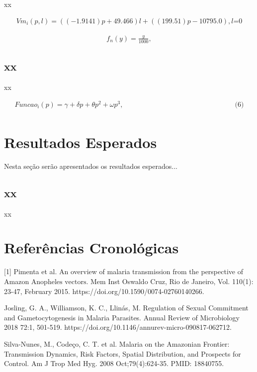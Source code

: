 \documentclass[12pt]{article}
\begin{document}
xx

\begin{align*}
Vm_{i}(p,l) = ((-1.9141)p + 49.466)l + ((199.51)p - 10795.0), \text {$l$=0} \tag{4}
\end{align*}

\begin{align*}
f_{n}(y) = \frac{y}{1000}, \tag{5}
\end{align*}

\subsection{xx}

xx

\begin{align*} 
Funcao_{i}(p) = \gamma + \delta p + \theta p^2 + \omega p^3, \qquad \qquad \qquad \qquad \qquad \qquad \qquad \qquad \text{(6)} \tag{6} \\
\end{align*} %

\newpage
\section{Resultados Esperados}

Nesta seção serão apresentados os resultados esperados...

\subsection{xx}

xx

\newpage

\section{Referências Cronológicas}
[1] Pimenta et al. An overview of malaria transmission from the perspective of Amazon $\text{Anopheles vectors}$. Mem Inst Oswaldo Cruz, Rio de Janeiro, Vol. 110(1): 23-47, February 2015. https://doi.org/10.1590/0074-02760140266.  

\noindent [2] Josling, G. A., Williamson, K. C., Llinás, M. Regulation of Sexual Commitment and Gametocytogenesis in Malaria Parasites. Annual Review of Microbiology 2018 72:1, 501-519. https://doi.org/10.1146/annurev-micro-090817-062712. 

\noindent [3] Silva-Nunes, M., Codeço, C. T. et al. Malaria on the Amazonian Frontier: Transmission Dynamics, Risk Factors, Spatial Distribution, and Prospects for Control. Am J Trop Med Hyg. 2008 Oct;79(4):624-35. PMID: 18840755.
\end{document}
